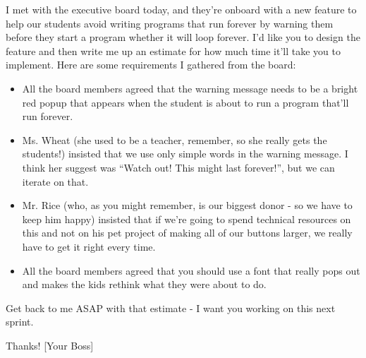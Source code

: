 \documentclass{report}
\newcommand*{\pts}[1]{\addtocounter{points}{#1}(#1pt)}
\begin{document}
\begin{spacing}{1.4}
\begin{enumerate}[leftmargin=*]
    I met with the executive board today, and they're onboard with a new feature to help our students avoid
    writing programs that run forever by warning them before they start a program whether it will loop forever.
    I'd like you to design the feature and then write me up an estimate for how much time it'll take you to
    implement. Here are some requirements I gathered from the board:
    \begin{itemize}
    \item All the board members agreed that the warning message needs to be a bright red popup that appears
      when the student is about to run a program that'll run forever.
    \item Ms. Wheat (she used to be a teacher, remember, so she really gets the students!) insisted that we
      use only simple words in the warning message. I think her suggest was ``Watch out! This might last forever!'', but
      we can iterate on that.
    \item Mr. Rice (who, as you might remember, is our biggest donor - so we have to keep him happy) insisted that
      if we're going to spend technical resources on this and not on his pet project of making all of our buttons larger,
      we really have to get it right every time.
    \item All the board members agreed that you should use a font that really pops out and makes the kids rethink what
      they were about to do.
    \end{itemize}

    Get back to me ASAP with that estimate - I want you working on this next sprint.

    Thanks!
    [Your Boss]
    
    






\end{enumerate}
\end{spacing}
\end{document}
